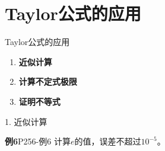\section{Taylor公式的应用}

\begin{frame}{Taylor公式的应用}
	\linespread{1.5}
	\begin{enumerate}\pause 
	  \item {\bf 近似计算}\pause 
	  \item {\bf 计算不定式极限}\pause 
	  \item {\bf 证明不等式}
	\end{enumerate}
\end{frame}

\begin{frame}{1. 近似计算}
	\linespread{1.2}\pause 
	\begin{exampleblock}{{\bf 例6}\hfill P256-例6}
		计算$e$的值，误差不超过$10^{-5}$。
	\end{exampleblock}\pause 
	\begin{columns}
			\begin{center}
			\end{center}\pause 
			\begin{center}

\end{center}
\end{columns}
\end{frame}
